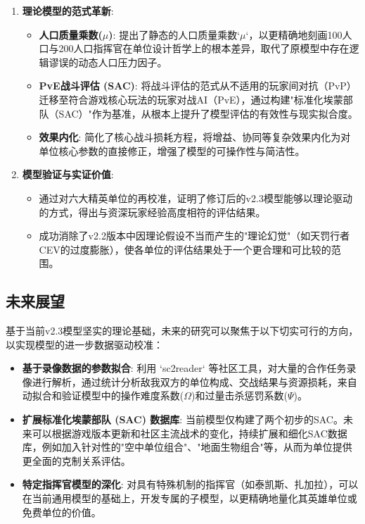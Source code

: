 \documentclass[a4paper,12pt]{article}
\begin{document}
\begin{enumerate}
\item \textbf{理论模型的范式革新}:
   \begin{itemize}
   \item \textbf{人口质量乘数($\mu$)}: 提出了静态的人口质量乘数`$\mu$`，以更精确地刻画100人口与200人口指挥官在单位设计哲学上的根本差异，取代了原模型中存在逻辑谬误的动态人口压力因子。
   \item \textbf{PvE战斗评估 (SAC)}: 将战斗评估的范式从不适用的玩家间对抗（PvP）迁移至符合游戏核心玩法的玩家对战AI（PvE），通过构建"标准化埃蒙部队（SAC）"作为基准，从根本上提升了模型评估的有效性与现实拟合度。
   \item \textbf{效果内化}: 简化了核心战斗损耗方程，将增益、协同等复杂效果内化为对单位核心参数的直接修正，增强了模型的可操作性与简洁性。
   \end{itemize}

\item \textbf{模型验证与实证价值}:
   \begin{itemize}
   \item 通过对六大精英单位的再校准，证明了修订后的v2.3模型能够以理论驱动的方式，得出与资深玩家经验高度相符的评估结果。
   \item 成功消除了v2.2版本中因理论假设不当而产生的"理论幻觉"（如天罚行者CEV的过度膨胀），使各单位的评估结果处于一个更合理和可比较的范围。
   \end{itemize}
\end{enumerate}

\subsection{未来展望}
基于当前v2.3模型坚实的理论基础，未来的研究可以聚焦于以下切实可行的方向，以实现模型的进一步数据驱动校准：

\begin{itemize}
    \item \textbf{基于录像数据的参数拟合}: 利用 `sc2reader` 等社区工具，对大量的合作任务录像进行解析，通过统计分析敌我双方的单位构成、交战结果与资源损耗，来自动拟合和验证模型中的操作难度系数($\Omega$)和过量击杀惩罚系数($\Psi$)。
    \item \textbf{扩展标准化埃蒙部队 (SAC) 数据库}: 当前模型仅构建了两个初步的SAC。未来可以根据游戏版本更新和社区主流战术的变化，持续扩展和细化SAC数据库，例如加入针对性的"空中单位组合"、"地面生物组合"等，从而为单位提供更全面的克制关系评估。
    \item \textbf{特定指挥官模型的深化}: 对具有特殊机制的指挥官（如泰凯斯、扎加拉），可以在当前通用模型的基础上，开发专属的子模型，以更精确地量化其英雄单位或免费单位的价值。
\end{itemize}
\end{document}
